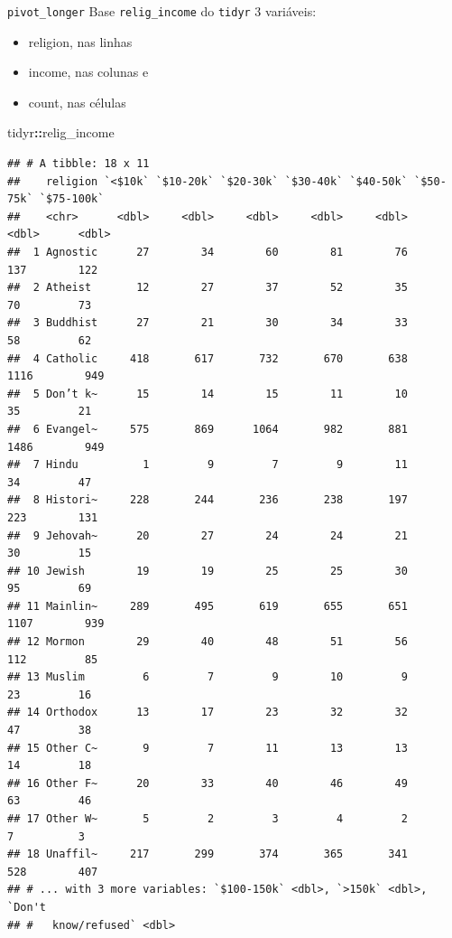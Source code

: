 \documentclass[
  10pt,
  ignorenonframetext,
]{beamer}
\newenvironment{Shaded}{\begin{snugshade}}{\end{snugshade}}
\newcommand{\NormalTok}[1]{#1}
\newcommand{\OperatorTok}[1]{\textcolor[rgb]{0.81,0.36,0.00}{\textbf{#1}}}
\providecommand{\tightlist}{%
  \setlength{\itemsep}{0pt}\setlength{\parskip}{0pt}}
\begin{document}
\begin{frame}[fragile]{\texttt{pivot\_longer}}
\protect\hypertarget{pivot_longer}{}
Base \texttt{relig\_income} do \texttt{tidyr} 3 variáveis:

\begin{itemize}
\tightlist
\item
  religion, nas linhas
\item
  income, nas colunas e
\item
  count, nas células
\end{itemize}

\begin{Shaded}
\begin{Highlighting}[]
\NormalTok{tidyr}\OperatorTok{::}\NormalTok{relig\_income}
\end{Highlighting}
\end{Shaded}

\begin{verbatim}
## # A tibble: 18 x 11
##    religion `<$10k` `$10-20k` `$20-30k` `$30-40k` `$40-50k` `$50-75k` `$75-100k`
##    <chr>      <dbl>     <dbl>     <dbl>     <dbl>     <dbl>     <dbl>      <dbl>
##  1 Agnostic      27        34        60        81        76       137        122
##  2 Atheist       12        27        37        52        35        70         73
##  3 Buddhist      27        21        30        34        33        58         62
##  4 Catholic     418       617       732       670       638      1116        949
##  5 Don’t k~      15        14        15        11        10        35         21
##  6 Evangel~     575       869      1064       982       881      1486        949
##  7 Hindu          1         9         7         9        11        34         47
##  8 Histori~     228       244       236       238       197       223        131
##  9 Jehovah~      20        27        24        24        21        30         15
## 10 Jewish        19        19        25        25        30        95         69
## 11 Mainlin~     289       495       619       655       651      1107        939
## 12 Mormon        29        40        48        51        56       112         85
## 13 Muslim         6         7         9        10         9        23         16
## 14 Orthodox      13        17        23        32        32        47         38
## 15 Other C~       9         7        11        13        13        14         18
## 16 Other F~      20        33        40        46        49        63         46
## 17 Other W~       5         2         3         4         2         7          3
## 18 Unaffil~     217       299       374       365       341       528        407
## # ... with 3 more variables: `$100-150k` <dbl>, `>150k` <dbl>, `Don't
## #   know/refused` <dbl>
\end{verbatim}
\end{frame}
\end{document}
